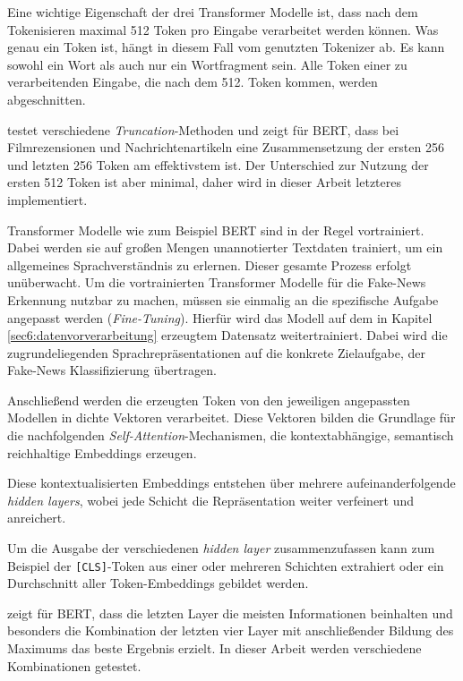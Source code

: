 Eine wichtige Eigenschaft der drei Transformer Modelle ist, dass nach dem Tokenisieren maximal 512 Token pro Eingabe verarbeitet werden können.
Was genau ein Token ist, hängt in diesem Fall vom genutzten Tokenizer ab. Es kann sowohl ein Wort als auch nur ein Wortfragment sein.
Alle Token einer zu verarbeitenden Eingabe, die nach dem 512. Token kommen, werden abgeschnitten.

\cite{sun2020finetuneberttextclassification} testet verschiedene \textit{Truncation}-Methoden und zeigt für BERT, dass bei Filmrezensionen und Nachrichtenartikeln eine 
Zusammensetzung der ersten 256 und letzten 256 Token am effektivstem ist. Der Unterschied zur Nutzung der ersten 512 Token ist aber minimal, daher wird in dieser Arbeit letzteres
implementiert.

Transformer Modelle wie zum Beispiel BERT sind in der Regel vortrainiert. Dabei werden sie auf großen Mengen unannotierter Textdaten trainiert, um ein allgemeines Sprachverständnis 
zu erlernen. Dieser gesamte Prozess erfolgt unüberwacht.
Um die vortrainierten Transformer Modelle für die Fake-News Erkennung nutzbar zu machen, müssen sie einmalig an die spezifische Aufgabe angepasst werden (\textit{Fine-Tuning}).
Hierfür wird das Modell auf dem in Kapitel \ref{sec6:datenvorverarbeitung} erzeugtem Datensatz weitertrainiert. Dabei wird die zugrundeliegenden Sprachrepräsentationen auf 
die konkrete Zielaufgabe, der Fake-News Klassifizierung übertragen.

Anschließend werden die erzeugten Token von den jeweiligen angepassten Modellen in dichte Vektoren verarbeitet.
Diese Vektoren bilden die Grundlage für die nachfolgenden \textit{Self-Attention}-Mechanismen, die kontextabhängige, semantisch reichhaltige Embeddings erzeugen.

Diese kontextualisierten Embeddings entstehen über mehrere aufeinanderfolgende \textit{hidden layers}, wobei jede Schicht die Repräsentation weiter verfeinert und anreichert. %

Um die Ausgabe der verschiedenen \textit{hidden layer} zusammenzufassen kann zum Beispiel der \texttt{[CLS]}-Token aus einer oder mehreren Schichten extrahiert oder ein 
Durchschnitt aller Token-Embeddings gebildet werden.

\cite{sun2020finetuneberttextclassification} zeigt für BERT, dass die letzten Layer die meisten Informationen beinhalten und
besonders die Kombination der letzten vier Layer mit anschließender Bildung des Maximums das beste Ergebnis erzielt.
In dieser Arbeit werden verschiedene Kombinationen getestet.

